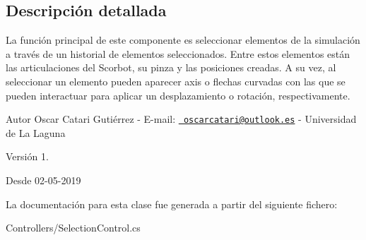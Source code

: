 \subsection{Descripción detallada}
La función principal de este componente es seleccionar elementos de la simulación a través de un historial de elementos seleccionados. Entre estos elementos están las articulaciones del Scorbot, su pinza y las posiciones creadas. A su vez, al seleccionar un elemento pueden aparecer axis o flechas curvadas con las que se pueden interactuar para aplicar un desplazamiento o rotación, respectivamente. \begin{DoxyAuthor}{Autor}
Oscar Catari Gutiérrez -\/ E-\/mail\+: \href{mailto:oscarcatari@outlook.es}{\texttt{ oscarcatari@outlook.\+es}} -\/ Universidad de La Laguna 
\end{DoxyAuthor}
\begin{DoxyVersion}{Versión}
1. 
\end{DoxyVersion}
\begin{DoxySince}{Desde}
02-\/05-\/2019 
\end{DoxySince}


La documentación para esta clase fue generada a partir del siguiente fichero\+:\begin{DoxyCompactItemize}
\item 
Controllers/Selection\+Control.\+cs\end{DoxyCompactItemize}
